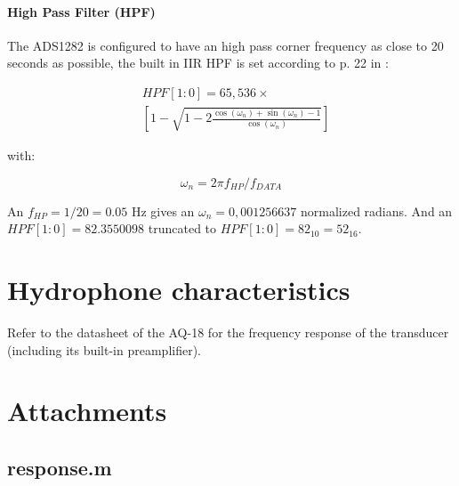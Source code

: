 \documentclass[a4paper]{article}
\begin{document}
\begin{multicols}{2}
\paragraph{High Pass Filter (HPF)} The ADS1282 is configured to have an high
pass corner frequency as close to 20 seconds as possible, the built in
IIR HPF is set according to p. 22 in :

\begin{equation}
  \begin{aligned}
    & HPF[1:0] = 65,536 \times \\
    & \left[ 1 - \sqrt{1 - 2 \frac{\cos (\omega_n) +
    \sin (\omega_n) - 1}{\cos
    (\omega_n)}}\right]
  \end{aligned}
  \label{eqn:hpf}
\end{equation}

with:

\begin{equation}
  \omega_n = 2 \pi f_{HP} / f_{DATA}
  \label{eqn:nat_freq}
\end{equation}

An $f_{HP} = 1/20 = 0.05 $ Hz gives an $\omega_n = 0,001256637$ normalized
radians. And an $HPF[1:0] = 82.3550098$ truncated to $HPF[1:0] = 82_{10} =
52_{16}$.

\section{Hydrophone characteristics}
Refer to the datasheet of the AQ-18 \cite{aq_18_ds} for the frequency response of the
transducer (including its built-in preamplifier).

\vspace{5em}
\printbibliography
\end{multicols}

\newpage

\section{Attachments}
\subsection{response.m}

\end{document}

